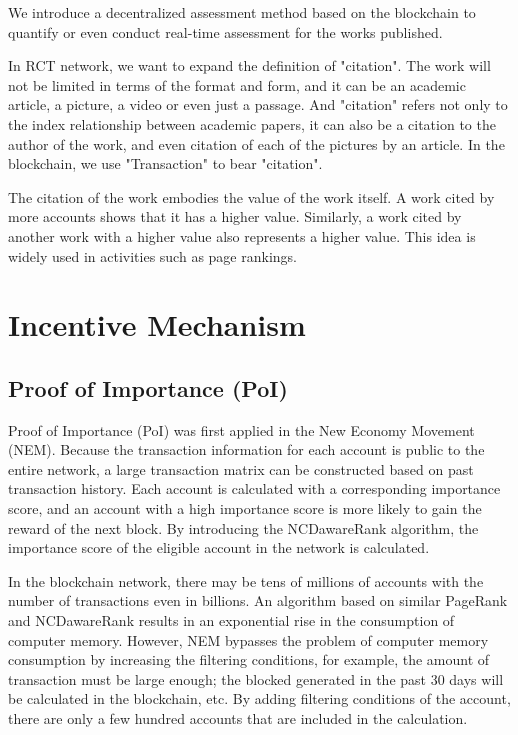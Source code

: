 \documentclass[a4paper,oneside,openany]{tufte-book}
\begin{document}
We introduce a decentralized assessment method based on the blockchain to quantify or even conduct real-time assessment for the works published.



In RCT network, we want to expand the definition of "citation". The work will not be limited in terms of the format and form, and it can be an academic article, a picture, a video or even just a passage. And "citation" refers not only to the index relationship between academic papers, it can also be a citation to the author of the work, and even citation of each of the pictures by an article. In the blockchain, we use "Transaction" to bear "citation".


The citation of the work embodies the value of the work itself. A work cited by more accounts shows that it has a higher value. Similarly, a work cited by another work with a higher value also represents a higher value. This idea is widely used in activities such as page rankings.




\section{Incentive Mechanism}


\subsection{Proof of Importance (PoI)}

Proof of Importance (PoI) was first applied in the New Economy Movement (NEM). Because the transaction information for each account is public to the entire network, a large transaction matrix can be constructed based on past transaction history. Each account is calculated with a corresponding importance score, and an account with a high importance score is more likely to gain the reward of the next block. By introducing the NCDawareRank algorithm, the importance score of the eligible account in the network is calculated.





In the blockchain network, there may be tens of millions of accounts with the number of transactions even in billions. An algorithm based on similar PageRank and NCDawareRank results in an exponential rise in the consumption of computer memory. However, NEM bypasses the problem of computer memory consumption by increasing the filtering conditions, for example, the amount of transaction must be large enough; the blocked generated in the past 30 days will be calculated in the blockchain, etc. By adding filtering conditions of the account, there are only a few hundred accounts that are included in the calculation.
\end{document}
